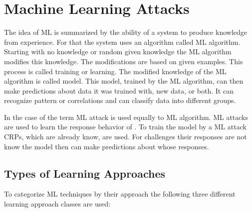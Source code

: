 
\section{Machine Learning Attacks}

The idea of \acf{ML} is summarized by the ability of a system to produce knowledge from experience.
For that the system uses an algorithm called \ac{ML} algorithm.
Starting with no knowledge or random given knowledge the \ac{ML} algorithm modifies this knowledge.
The modifications are based on given examples. 
This process is called training or learning.
The modified knowledge of the \ac{ML} algorithm is called model.
This model, trained by the \ac{ML} algorithm, can then make predictions about data it was trained with, new data, or both.
It can recognize pattern or correlations and can classify data into different groups.

In the case of \pufs the term \ac{ML} attack is used equally to \ac{ML} algorithm.
\ac{ML} attacks are used to learn the response behavior of \pufs.
To train the model by a \ac{ML} attack \acp{CRP}, which are already know, are used.
For challenges their responses are not know the model then can make predictions about whose responses.


\subsection{Types of Learning Approaches}

To categorize \ac{ML} techniques by their approach the following three different learning approach classes are used: %

